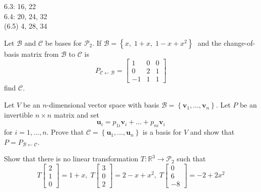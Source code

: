 \documentclass[11pt,letterpaper,boxed]{pset}
\begin{document}
    \begin{center}
        6.3: 16, 22 \\
        6.4: 20, 24, 32 \\
        (6.5) 4, 28, 34
    \end{center}
    
    \begin{problem} [6.3 \#16]
    Let $\mathscr{B}$ and $\mathscr{C}$ be bases for $\mathscr{P}_2$. If $\mathscr{B} = \left\{x,\; 1+x,\; 1-x+x^2\right\}\;$ and the change-of-basis matrix from $\mathscr{B}$ to $\mathscr{C}$ is 
    $$P_{\mathscr{C} \xleftarrow{} \mathscr{B}} = 
    \begin{bmatrix}
        1 & 0 & 0 \\
        0 & 2 & 1 \\
        -1& 1 & 1 
    \end{bmatrix}$$
    find $\mathscr{C}$.
    \end{problem}
    \newpage
    
    
    \begin{problem} [6.3 \#22]
    Let $V$ be an $n$-dimensional vector space with basis $\mathscr{B}= \left\{\textbf{v}_1, ..., \textbf{v}_n\right\}$. Let $P$ be an invertible $n\times n$ matrix and set 
    $$\textbf{u}_i = p_{1i}\textbf{v}_i + ... + p_{ni} \textbf{v}_i $$
    for $i=1, ..., n$. Prove that $\mathscr{C}=\left\{\textbf{u}_1, ..., \textbf{u}_n\right\}$ is a basis for $V$ and show that $P=P_{\mathscr{B}\xleftarrow{}\mathscr{C}}$.
    \end{problem}
    \newpage
    
    
    \begin{problem} [6.4 \#20]
    Show that there is no linear transformation $T:\mathbb{R}^3\xrightarrow{} \mathscr{P}_2$ such that
    $$T\begin{bmatrix}2\\1\\0\end{bmatrix}= 1+x, \; T\begin{bmatrix}3\\0\\2\end{bmatrix}=2-x+x^2, \; T\begin{bmatrix}0\\6\\-8 \end{bmatrix}=-2+2x^2$$
    \end{problem}
    \newpage
    
\end{document}
